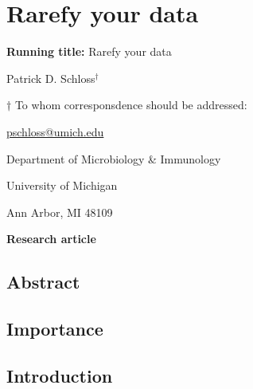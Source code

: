 \documentclass[
]{article}
\author{}
\date{\vspace{-2.5em}}
\begin{document}
\hypertarget{rarefy-your-data}{%
\section{Rarefy your data}\label{rarefy-your-data}}

\vspace{20mm}

\textbf{Running title:} Rarefy your data

\vspace{20mm}

Patrick D. Schloss\({^\dagger}\)

\vspace{40mm}

\({\dagger}\) To whom corresponsdence should be addressed:

\href{mailto:pschloss@umich.edu}{pschloss@umich.edu}

Department of Microbiology \& Immunology

University of Michigan

Ann Arbor, MI 48109

\vspace{20mm}

\textbf{Research article}

\newpage

\hypertarget{abstract}{%
\subsection{Abstract}\label{abstract}}

\hypertarget{importance}{%
\subsection{Importance}\label{importance}}

\newpage

\hypertarget{introduction}{%
\subsection{Introduction}\label{introduction}}
\end{document}
